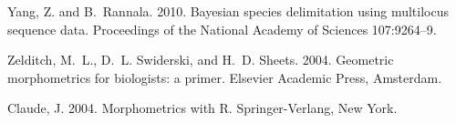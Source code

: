 \documentclass[12pt,letterpaper]{article}
\begin{document}
\begin{thebibliography}{77}
    Yang, Z. and B.~Rannala. 2010. {Bayesian species delimitation using multilocus
    sequence data.} Proceedings of the National Academy of Sciences 107:9264--9.

    Zelditch, M.~L., D.~L. Swiderski, and H.~D. Sheets. 2004. {Geometric
    morphometrics for biologists: a primer}. Elsevier Academic Press, Amsterdam.

    Claude, J. 2004. {Morphometrics with R}. Springer-Verlang, New York.
    

\end{thebibliography}
\end{document}

